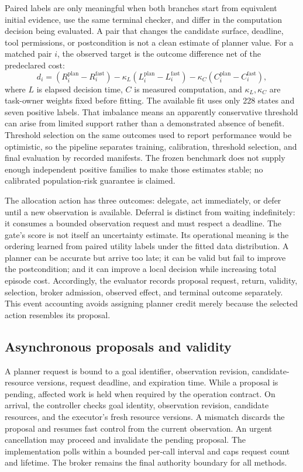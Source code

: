 \documentclass[11pt]{article}
\begin{document}
Paired labels are only meaningful when both branches start from equivalent initial evidence, use the same terminal checker, and differ in the computation decision being evaluated. A pair that changes the candidate surface, deadline, tool permissions, or postcondition is not a clean estimate of planner value. For a matched pair $i$, the observed target is the outcome difference net of the predeclared cost:
\begin{equation}
 d_i = (R_i^{\mathrm{plan}}-R_i^{\mathrm{fast}})-\kappa_L(L_i^{\mathrm{plan}}-L_i^{\mathrm{fast}})-\kappa_C(C_i^{\mathrm{plan}}-C_i^{\mathrm{fast}}),
\end{equation}
where $L$ is elapsed decision time, $C$ is measured computation, and $\kappa_L,\kappa_C$ are task-owner weights fixed before fitting. The available fit uses only 228 states and seven positive labels. That imbalance means an apparently conservative threshold can arise from limited support rather than a demonstrated absence of benefit. Threshold selection on the same outcomes used to report performance would be optimistic, so the pipeline separates training, calibration, threshold selection, and final evaluation by recorded manifests. The frozen benchmark does not supply enough independent positive families to make those estimates stable; no calibrated population-risk guarantee is claimed.

The allocation action has three outcomes: delegate, act immediately, or defer until a new observation is available. Deferral is distinct from waiting indefinitely: it consumes a bounded observation request and must respect a deadline. The gate's score is not itself an uncertainty estimate. Its operational meaning is the ordering learned from paired utility labels under the fitted data distribution. A planner can be accurate but arrive too late; it can be valid but fail to improve the postcondition; and it can improve a local decision while increasing total episode cost. Accordingly, the evaluator records proposal request, return, validity, selection, broker admission, observed effect, and terminal outcome separately. This event accounting avoids assigning planner credit merely because the selected action resembles its proposal.

\subsection{Asynchronous proposals and validity}
A planner request is bound to a goal identifier, observation revision, candidate-resource versions, request deadline, and expiration time. While a proposal is pending, affected work is held when required by the operation contract. On arrival, the controller checks goal identity, observation revision, candidate resources, and the executor's fresh resource versions. A mismatch discards the proposal and resumes fast control from the current observation. An urgent cancellation may proceed and invalidate the pending proposal. The implementation polls within a bounded per-call interval and caps request count and lifetime. The broker remains the final authority boundary for all methods.
\end{document}
